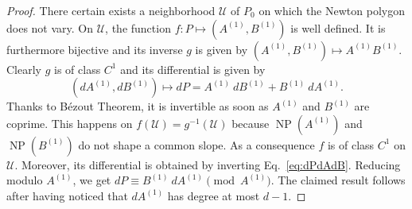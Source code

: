 \documentclass{sig-alternate-2013}
\DeclareMathOperator{\NP}{NP}
\begin{document}
\begin{proof}
There certain exists a neighborhood $\mathcal U$ of $P_0$ on which the 
Newton polygon does not vary. On $\mathcal U$, the function $f : P 
\mapsto (A^{(1)},B^{(1)})$ is well defined. It is furthermore bijective 
and its inverse $g$ is given by $(A^{(1)},B^{(1)}) \mapsto A^{(1)}B^{(1)}$.
Clearly $g$ is of class $C^1$ and its differential is given by
\begin{equation}
\label{eq:dPdAdB}
(dA^{(1)}, dB^{(1)}) \mapsto dP = A^{(1)} \: dB^{(1)} + B^{(1)} \: dA^{(1)}.
\end{equation}
Thanks to Bézout Theorem, it is invertible as soon as $A^{(1)}$ and $B^{(1)}$ are
coprime. This happens on $f(\mathcal U) = g^{-1}(\mathcal U)$ because 
$\NP(A^{(1)})$ and $\NP(B^{(1)})$ do not shape a common slope. As a consequence
$f$ is of class $C^1$ on $\mathcal U$. Moreover, its differential is
obtained by inverting Eq.~\eqref{eq:dPdAdB}. Reducing modulo $A^{(1)}$, we
get $dP \equiv B^{(1)} \: dA^{(1)} \pmod {A^{(1)}}$.
The claimed result follows after having noticed that $dA^{(1)}$
has degree at most $d{-}1$.
\end{proof}
\end{document}
